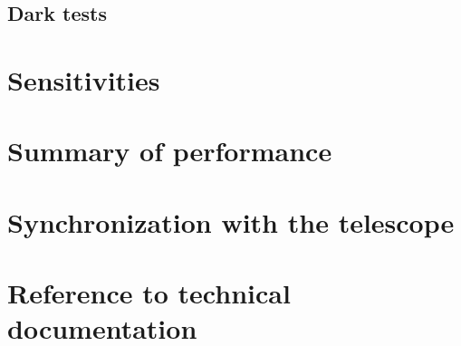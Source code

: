 \documentclass[a4paper, 11pt]{article} %
\begin{document}
\clearpage
\subsection{Dark tests}
\label{se:dark}



\section{Sensitivities}
\label{se:nefd}


\clearpage
\section{Summary of performance}
\label{se:summary}


\clearpage
\appendix

  \section{Synchronization with the telescope}
  \label{ap:synchro}
  
  
  \section{Reference to technical documentation}
  \label{ap:doc}
  


\clearpage

%



\end{document}
